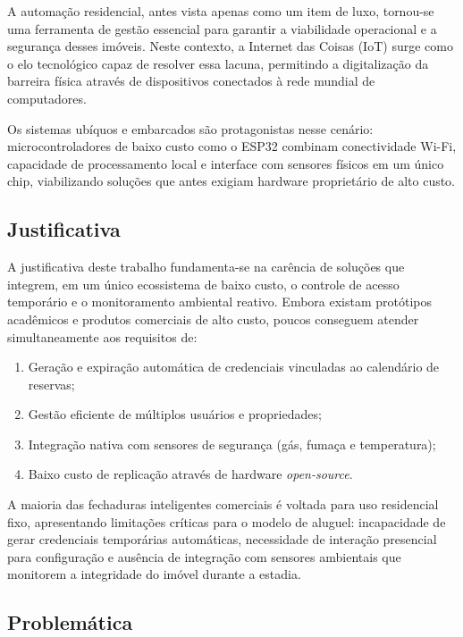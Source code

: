 \documentclass[12pt,a4paper]{article}
\begin{document}
A automação residencial, antes vista apenas como um item de luxo, tornou-se uma
ferramenta de gestão essencial para garantir a viabilidade operacional e a segurança
desses imóveis. Neste contexto, a Internet das Coisas (IoT) surge como o elo
tecnológico capaz de resolver essa lacuna, permitindo a digitalização da barreira
física através de dispositivos conectados à rede mundial de computadores.

Os sistemas ubíquos e embarcados são protagonistas nesse cenário: microcontroladores
de baixo custo como o ESP32 combinam conectividade Wi-Fi, capacidade de processamento
local e interface com sensores físicos em um único chip, viabilizando soluções que
antes exigiam hardware proprietário de alto custo.

\subsection{Justificativa}

A justificativa deste trabalho fundamenta-se na carência de soluções que integrem,
em um único ecossistema de baixo custo, o controle de acesso temporário e o
monitoramento ambiental reativo. Embora existam protótipos acadêmicos e produtos
comerciais de alto custo, poucos conseguem atender simultaneamente aos requisitos de:
\begin{enumerate}
  \item Geração e expiração automática de credenciais vinculadas ao calendário de
        reservas;
  \item Gestão eficiente de múltiplos usuários e propriedades;
  \item Integração nativa com sensores de segurança (gás, fumaça e temperatura);
  \item Baixo custo de replicação através de hardware \emph{open-source}.
\end{enumerate}

A maioria das fechaduras inteligentes comerciais é voltada para uso residencial fixo,
apresentando limitações críticas para o modelo de aluguel: incapacidade de gerar
credenciais temporárias automáticas, necessidade de interação presencial para
configuração e ausência de integração com sensores ambientais que monitorem a
integridade do imóvel durante a estadia.

\subsection{Problemática}
\end{document}
